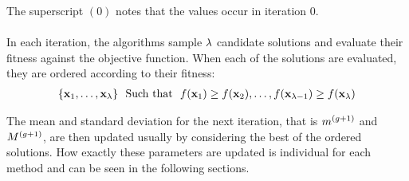 The superscript $(0)$ notes that the values occur in iteration 0.\\
\\
In each iteration, the algorithms sample $\lambda$ candidate solutions 
and evaluate their fitness
against the objective function. When each of the solutions are evaluated,
they are ordered according to their fitness:
\begin{align}
\{\textbf{\individual }_{1}, \hdots, 
\textbf{\individual }_{\populationSize }\}\ \ \text{Such that}\ \ 
\fitnessFunction(\textbf{x}_1) \geq 
\fitnessFunction(\textbf{\individual }_2), \hdots, 
\fitnessFunction(\textbf{\individual }_{\populationSize  - 1}) \geq 
\fitnessFunction(\textbf{\individual }_{\populationSize })
\end{align}

The mean and standard deviation for the next iteration, 
that is $m^{(g+1)}$ and $M^{(g+1)}$, are
then updated usually by considering the best of the ordered solutions. How exactly
these parameters are updated is individual for each method and can be seen in the following
sections.


